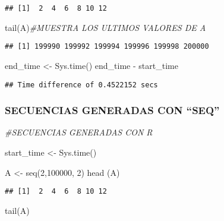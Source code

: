 \documentclass[preprint, 3p,
authoryear]{elsarticle} %
\newenvironment{Shaded}{\begin{snugshade}}{\end{snugshade}}
\newcommand{\CommentTok}[1]{\textcolor[rgb]{0.56,0.35,0.01}{\textit{#1}}}
\newcommand{\DecValTok}[1]{\textcolor[rgb]{0.00,0.00,0.81}{#1}}
\newcommand{\FunctionTok}[1]{\textcolor[rgb]{0.00,0.00,0.00}{#1}}
\newcommand{\NormalTok}[1]{#1}
\newcommand{\OtherTok}[1]{\textcolor[rgb]{0.56,0.35,0.01}{#1}}
\newcommand{\SpecialCharTok}[1]{\textcolor[rgb]{0.00,0.00,0.00}{#1}}
\begin{document}
\begin{verbatim}
## [1]  2  4  6  8 10 12
\end{verbatim}

\begin{Shaded}
\begin{Highlighting}[]
\FunctionTok{tail}\NormalTok{(A)}\CommentTok{\#MUESTRA LOS ULTIMOS VALORES DE A}
\end{Highlighting}
\end{Shaded}

\begin{verbatim}
## [1] 199990 199992 199994 199996 199998 200000
\end{verbatim}

\begin{Shaded}
\begin{Highlighting}[]
\NormalTok{end\_time }\OtherTok{\textless{}{-}} \FunctionTok{Sys.time}\NormalTok{()}
\NormalTok{end\_time }\SpecialCharTok{{-}}\NormalTok{ start\_time}
\end{Highlighting}
\end{Shaded}

\begin{verbatim}
## Time difference of 0.4522152 secs
\end{verbatim}

\hypertarget{secuencias-generadas-con-seq}{%
\subsubsection{SECUENCIAS GENERADAS CON
``SEQ''}\label{secuencias-generadas-con-seq}}

\begin{Shaded}
\begin{Highlighting}[]
\CommentTok{\#SECUENCIAS GENERADAS CON R}

\NormalTok{start\_time }\OtherTok{\textless{}{-}} \FunctionTok{Sys.time}\NormalTok{()}

\NormalTok{A }\OtherTok{\textless{}{-}} \FunctionTok{seq}\NormalTok{(}\DecValTok{2}\NormalTok{,}\DecValTok{100000}\NormalTok{, }\DecValTok{2}\NormalTok{)}
\FunctionTok{head}\NormalTok{ (A)}
\end{Highlighting}
\end{Shaded}

\begin{verbatim}
## [1]  2  4  6  8 10 12
\end{verbatim}

\begin{Shaded}
\begin{Highlighting}[]
\FunctionTok{tail}\NormalTok{(A)}
\end{Highlighting}
\end{Shaded}
\end{document}
